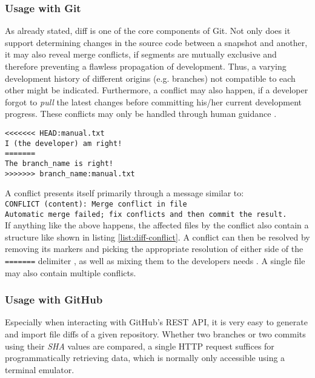 \subsubsection{Usage with Git}
As already stated, diff is one of the core components of Git. Not only does it support determining changes in the source code between a snapshot and another, it may also reveal merge conflicts, if segments are mutually exclusive and therefore preventing a flawless propagation of development. Thus, a varying development history of different origins (e.g. branches) not compatible to each other might be indicated. Furthermore, a conflict may also happen, if a developer forgot to \emph{pull} the latest changes before committing his/her current development progress. These conflicts may only be handled through human guidance \cite[124]{loeliger2012version}.

\begin{lstlisting}[label={list:diff-conflict}, caption={A snippet of a file called ``manual.txt'', which is affected by a conflict. Content between \texttt{HEAD} and \texttt{=======} contains the local version, content below contains the foreign conflicting version.}]
<<<<<<< HEAD:manual.txt
I (the developer) am right!
=======
The branch_name is right!
>>>>>>> branch_name:manual.txt
\end{lstlisting}

A conflict presents itself primarily through a message similar to:\\
\texttt{CONFLICT (content): Merge conflict in file\\
Automatic merge failed; fix conflicts and then commit the result.}\\
If anything like the above happens, the affected files by the conflict also contain a structure like shown in listing \ref{list:diff-conflict}. A conflict can then be resolved by removing its markers and picking the appropriate resolution of either side of the \texttt{=======} delimiter \cite{GitConflicts}, as well as mixing them to the developers needs \cite[126]{loeliger2012version}. A single file may also contain multiple conflicts.

\subsubsection{Usage with GitHub}
Especially when interacting with GitHub's REST API, it is very easy to generate and import file diffs of a given repository. Whether two branches or two commits using their \emph{SHA} values are compared, a single HTTP request suffices for programmatically retrieving data, which is normally only accessible using a terminal emulator.

